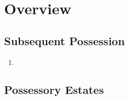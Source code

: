\section{Overview}

\subsection{Subsequent Possession}

\begin{enumerate}
    \item %
\end{enumerate}

\subsection{Possessory Estates}

